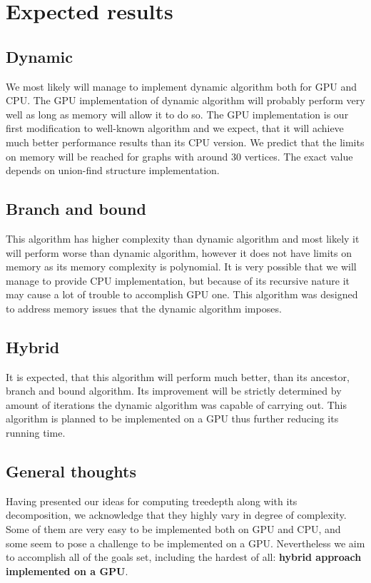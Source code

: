 \section{Expected results}

\subsection{Dynamic}
We most likely will manage to implement dynamic algorithm both for GPU and CPU. The GPU implementation of dynamic algorithm will probably perform very well as long as memory will allow it to do so. The GPU implementation is our first modification to well-known algorithm and we expect, that it will achieve much better performance results than its CPU version. We predict that the limits on memory will be reached for graphs with around 30 vertices. The exact value depends on union-find structure implementation.

\subsection{Branch and bound}
This algorithm has higher complexity than dynamic algorithm and most likely it will perform worse than dynamic algorithm, however it does not have limits on memory as its memory complexity is polynomial. It is very possible that we will manage to provide CPU implementation, but because of its recursive nature it may cause a lot of trouble to accomplish GPU one. This algorithm was designed to address memory issues that the dynamic algorithm imposes.

\subsection{Hybrid}
It is expected, that this algorithm will perform much better, than its ancestor, branch and bound algorithm. Its improvement will be strictly determined by amount of iterations the dynamic algorithm was capable of carrying out. This algorithm is planned to be implemented on a GPU thus further reducing its running time.

\subsection{General thoughts}
Having presented our ideas for computing treedepth along with its decomposition, we acknowledge that they highly vary in degree of complexity. Some of them are very easy to be implemented both on GPU and CPU, and some seem to pose a challenge to be implemented on a GPU. Nevertheless we aim to accomplish all of the goals set, including the hardest of all: \textbf{hybrid approach implemented on a GPU}.
